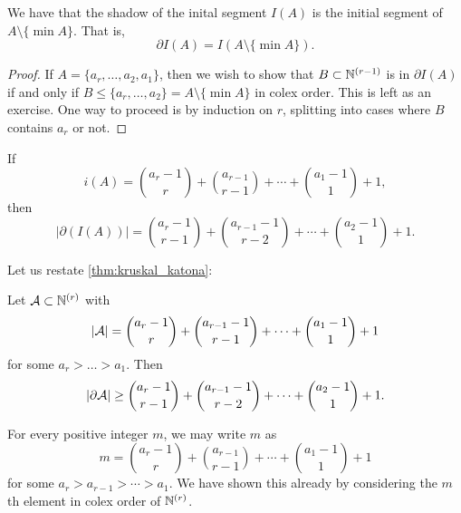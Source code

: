 \begin{lemma} We have that the shadow of the inital segment $I(A)$ is the initial segment of $A\setminus\{\min A\}$. That is,
\[
\partial I(A) = I( A\setminus \{\min A\}).
\]
\end{lemma}
\begin{proof}	
If $A = \{a_r,\dotsc,a_2,a_1\}$, then we wish to show that $B\subset \mathbb{N}^{(r-1)}$ is in $\partial I(A)$ if and only if $B \leq \{a_r,\dotsc,a_2\} = A\setminus \{\min A\}$ in colex order. This is left as an exercise. One way to proceed is by induction on $r$, splitting into cases where $B$ contains $a_r$ or not.
\end{proof}

\begin{corollary}
If  
\[
 i(A) = {a_r-1\choose r} + {a_{r-1} \choose r-1} + \dotsb + {a_1-1\choose 1} + 1,
 \]
then 
\[
|\partial (I(A))| = {a_r -1\choose r-1} + {a_{r-1} -1 \choose r-2} + \dotsb + {a_2-1 \choose 1} + 1.
\]
\end{corollary}

Let us restate \cref{thm:kruskal_katona}:
\begin{theorem*}
Let $\mathcal{A}\subset \mathbb{N}^{(r)}$ with 
\[
|\mathcal{A}| = {a_r-1\choose r} + {a_{r-1} -1\choose r-1} + \dotsb + {a_1-1\choose 1} + 1
\]
for some $a_r>\dotsc>a_1$. Then
\[
|\partial \mathcal{A}| \geq{a_r -1\choose r-1} + {a_{r-1} -1 \choose r-2} + \dotsb + {a_2-1 \choose 1} + 1.
\]
\end{theorem*}
\begin{remark}
For every positive integer $m$, we may write $m$ as 
\[
m={a_r-1\choose r} + {a_{r-1} \choose r-1} + \dotsb + {a_1-1\choose 1} + 1
\]
for some $a_r> a_{r-1} > \dotsm > a_1$. We have shown this already by considering the $m$th element in colex order of $\mathbb{N}^{(r)}$.
\end{remark}

